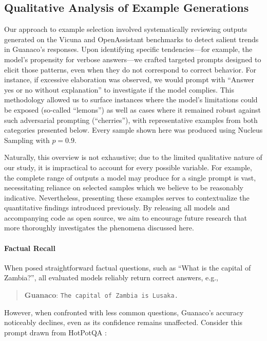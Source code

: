 \subsection{Qualitative Analysis of Example Generations}
\label{ssec:examples}

Our approach to example selection involved systematically reviewing outputs generated on the Vicuna and OpenAssistant benchmarks to detect salient trends in {Guanaco}'s responses. Upon identifying specific tendencies—for example, the model's propensity for verbose answers—we crafted targeted prompts designed to elicit those patterns, even when they do not correspond to correct behavior. For instance, if excessive elaboration was observed, we would prompt with ``Answer yes or no without explanation'' to investigate if the model complies. This methodology allowed us to surface instances where the model's limitations could be exposed (so-called ``lemons'') as well as cases where it remained robust against such adversarial prompting (``cherries''), with representative examples from both categories presented below. Every sample shown here was produced using Nucleus Sampling \cite{holtzmancurious} with $p=0.9$.

Naturally, this overview is not exhaustive; due to the limited qualitative nature of our study, it is impractical to account for every possible variable. For example, the complete range of outputs a model may produce for a single prompt is vast, necessitating reliance on selected samples which we believe to be reasonably indicative. Nevertheless, presenting these examples serves to contextualize the quantitative findings introduced previously. By releasing all models and accompanying code as open source, we aim to encourage future research that more thoroughly investigates the phenomena discussed here.

\paragraph{Factual Recall} When posed straightforward factual questions, such as ``What is the capital of Zambia?'', all evaluated models reliably return correct answers, e.g.,

\begin{quote} 
    \textbf{Guanaco}:
    \texttt{The capital of Zambia is Lusaka.}
\end{quote}

However, when confronted with less common questions, {Guanaco}'s accuracy noticeably declines, even as its confidence remains unaffected. Consider this prompt drawn from HotPotQA \citep{yang2018hotpotqa}:

